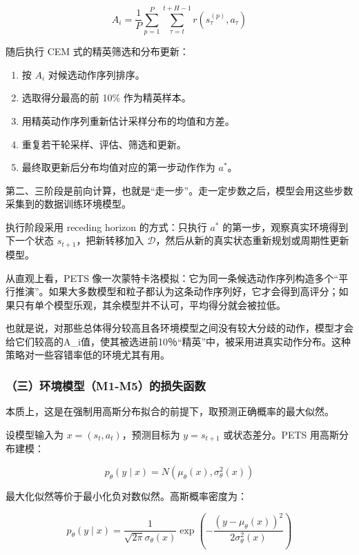 \[
A_i=\frac{1}{P}\sum_{p=1}^{P}\sum_{\tau=t}^{t+H-1}r(s_{\tau}^{(p)},a_{\tau})
\]

随后执行 CEM 式的精英筛选和分布更新：

\begin{enumerate}
\def\labelenumi{\arabic{enumi}.}
\tightlist
\item
  按 \(A_i\) 对候选动作序列排序。
\item
  选取得分最高的前 10\% 作为精英样本。
\item
  用精英动作序列重新估计采样分布的均值和方差。
\item
  重复若干轮采样、评估、筛选和更新。
\item
  最终取更新后分布均值对应的第一步动作作为 \(a^*\)。
\end{enumerate}

第二、三阶段是前向计算，也就是``走一步''。走一定步数之后，模型会用这些步数采集到的数据训练环境模型。

执行阶段采用 receding horizon 的方式：只执行 \(a^*\) 的第一步，观察真实环境得到下一个状态 \(s_{t+1}\)，把新转移加入 \(\mathcal D\)，然后从新的真实状态重新规划或周期性更新模型。

从直观上看，PETS 像一次蒙特卡洛模拟：它为同一条候选动作序列构造多个``平行推演''。如果大多数模型和粒子都认为这条动作序列好，它才会得到高评分；如果只有单个模型乐观，其余模型并不认可，平均得分就会被拉低。

也就是说，对那些总体得分较高且各环境模型之间没有较大分歧的动作，模型才会给它们较高的A\_i值，使其被选进前10％``精英''中，被采用进真实动作分布。这种策略对一些容错率低的环境尤其有用。

\hypertarget{ux4e09ux73afux5883ux6a21ux578bm1-m5ux7684ux635fux5931ux51fdux6570}{%
\subsubsection{（三）环境模型（M1-M5）的损失函数}\label{ux4e09ux73afux5883ux6a21ux578bm1-m5ux7684ux635fux5931ux51fdux6570}}

本质上，这是在强制用高斯分布拟合的前提下，取预测正确概率的最大似然。

设模型输入为 \(x=(s_t,a_t)\)，预测目标为 \(y=s_{t+1}\) 或状态差分。PETS 用高斯分布建模：

\[
p_\theta(y\mid x)=N(\mu_\theta(x),\sigma_\theta^2(x))
\]

最大化似然等价于最小化负对数似然。高斯概率密度为：

\[
p_\theta(y\mid x)=\frac{1}{\sqrt{2\pi}\sigma_\theta(x)}
\exp\left(-\frac{(y-\mu_\theta(x))^2}{2\sigma_\theta^2(x)}\right)
\]

